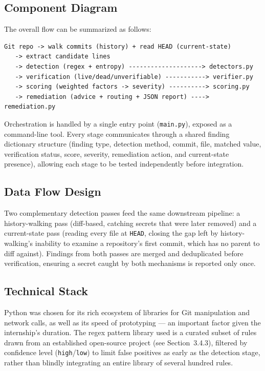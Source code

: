 \documentclass[12pt]{article}
\begin{document}
\subsection{Component Diagram}

The overall flow can be summarized as follows:

\begin{center}
\small
\begin{verbatim}
Git repo -> walk commits (history) + read HEAD (current-state)
   -> extract candidate lines
   -> detection (regex + entropy) --------------------> detectors.py
   -> verification (live/dead/unverifiable) -----------> verifier.py
   -> scoring (weighted factors -> severity) ----------> scoring.py
   -> remediation (advice + routing + JSON report) ----> remediation.py
\end{verbatim}
\end{center}

Orchestration is handled by a single entry point (\texttt{main.py}), exposed as a command-line tool. Every stage communicates through a shared finding dictionary structure (finding type, detection method, commit, file, matched value, verification status, score, severity, remediation action, and current-state presence), allowing each stage to be tested independently before integration.

\subsection{Data Flow Design}

Two complementary detection passes feed the same downstream pipeline: a history-walking pass (diff-based, catching secrets that were later removed) and a current-state pass (reading every file at \texttt{HEAD}, closing the gap left by history-walking's inability to examine a repository's first commit, which has no parent to diff against). Findings from both passes are merged and deduplicated before verification, ensuring a secret caught by both mechanisms is reported only once.

\subsection{Technical Stack}

Python was chosen for its rich ecosystem of libraries for Git manipulation and network calls, as well as its speed of prototyping --- an important factor given the internship's duration. The regex pattern library used is a curated subset of rules drawn from an established open-source project (see Section~3.4.3), filtered by confidence level (\texttt{high}/\texttt{low}) to limit false positives as early as the detection stage, rather than blindly integrating an entire library of several hundred rules.
\end{document}
